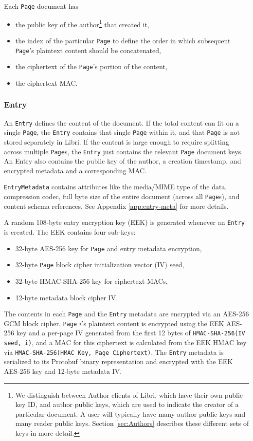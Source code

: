 \documentclass[10pt]{article}
\newcommand{\ttt}[1]{\texttt{#1}}
\def\Entry{\ttt{Entry}}
\def\Page{\ttt{Page}}
\begin{document}
Each \Page{} document has 
\begin{itemize}
	\item the public key of the author\footnote{We distinguish between Author clients of Libri, which have their own public key ID, and author public keys, which are used to indicate the creator of a particular document. A user will typically have many author public keys and many reader public keys. Section \ref{sec:Authors} describes these different sets of keys in more detail.} that created it,
	\item the index of the particular \Page{} to define the order in which subsequent \Page{}'s plaintext content should be concatenated,
	\item the ciphertext of the \Page{}'s portion of the content,
	\item the ciphertext MAC.
\end{itemize}

\subsubsection{Entry}
An \Entry{} defines the content of the document. If the total content can fit on a single \Page{}, the \Entry{} contains that single \Page{} within it, and that \Page{} is not stored separately in Libri. If the content is large enough to require splitting across multiple \Page{}s, the \Entry{} just contains the relevant \Page{} document keys. An Entry also contains the public key of the author, a creation timestamp, and encrypted metadata and a corresponding MAC. 

\ttt{EntryMetadata} contains attributes like the media/MIME type of the data, compression codec, full byte size of the entire document (across all \Page{}s), and content schema references. See Appendix \ref{app:entry-meta} for more details. 

A random 108-byte entry encryption key (EEK) is generated whenever an \Entry{} is created. The EEK contains four sub-keys:
\begin{itemize}
	\item 32-byte AES-256 key for \Page{} and entry metadata encryption,
	\item 32-byte \Page{} block cipher initialization vector (IV) seed,
	\item 32-byte HMAC-SHA-256 key for ciphertext MACs,
	\item 12-byte metadata block cipher IV.
\end{itemize}
The contents in each \Page{} and the \Entry{} metadata are encrypted via an AES-256 GCM block cipher. \Page{} $i$'s plaintext content is encrypted using the EEK AES-256 key and a per-page IV generated from the first 12 bytes of \ttt{HMAC-SHA-256(IV seed, i)}, and a MAC for this ciphertext is calculated from the EEK HMAC key via \ttt{HMAC-SHA-256(HMAC Key, Page Ciphertext)}. The \Entry{} metadata is serialized to its Protobuf binary representation and encrypted with the EEK AES-256 key and 12-byte metadata IV. 
\end{document}

